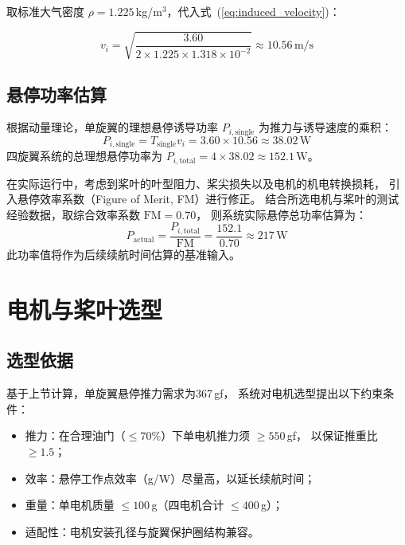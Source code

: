 取标准大气密度 $\rho = 1.225$\,kg/m$^3$，代入式~(\ref{eq:induced_velocity})：

\begin{equation}
    v_i = \sqrt{\frac{3.60}{2 \times 1.225 \times 1.318 \times 10^{-2}}} \approx 10.56\,\text{m/s}
    \label{eq:vi_result}
\end{equation}

\subsection{悬停功率估算}
根据动量理论，单旋翼的理想悬停诱导功率 $P_{i,\text{single}}$ 为推力与诱导速度的乘积：
\begin{equation}
    P_{i,\text{single}} = T_{\text{single}} v_i = 3.60 \times 10.56 \approx 38.02\,\text{W}
    \label{eq:ideal_power_single}
\end{equation}
四旋翼系统的总理想悬停功率为 $P_{i,\text{total}} = 4 \times 38.02 \approx 152.1\,\text{W}$。

在实际运行中，考虑到桨叶的叶型阻力、桨尖损失以及电机的机电转换损耗，
引入悬停效率系数（Figure of Merit, FM）进行修正。
结合所选电机与桨叶的测试经验数据，取综合效率系数 $\text{FM} = 0.70$，
则系统实际悬停总功率估算为：
\begin{equation}
    P_{\text{actual}} = \frac{P_{i,\text{total}}}{\text{FM}} = \frac{152.1}{0.70} \approx 217\,\text{W}
    \label{eq:actual_power}
\end{equation}
此功率值将作为后续续航时间估算的基准输入。


\section{电机与桨叶选型}

\subsection{选型依据}

基于上节计算，单旋翼悬停推力需求为367\,gf，
系统对电机选型提出以下约束条件：

\begin{itemize}
    \item 推力：在合理油门（$\leq 70\%$）下单电机推力须 $\geq 550$\,gf，
          以保证推重比 $\geq 1.5$；
    \item 效率：悬停工作点效率（g/W）尽量高，以延长续航时间；
    \item 重量：单电机质量 $\leq 100$\,g（四电机合计 $\leq 400$\,g）；
    \item 适配性：电机安装孔径与旋翼保护圈结构兼容。
\end{itemize}

